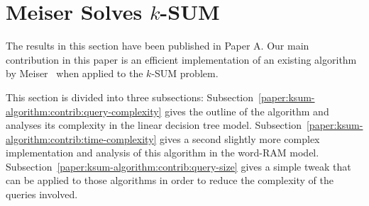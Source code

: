 \section{Meiser Solves \(k\)-SUM}

The results in this section have been published in Paper A.
Our main contribution in this paper is an efficient implementation of an
existing algorithm by Meiser~\cite{M93} when applied to the \(k\)-SUM problem.

This section is divided into three subsections:
Subsection~\ref{paper:ksum-algorithm:contrib:query-complexity} gives the outline of the
algorithm and analyses its complexity in the linear decision tree model.
Subsection~\ref{paper:ksum-algorithm:contrib:time-complexity} gives a second
slightly more complex implementation and analysis of this algorithm in the word-RAM
model. Subsection~\ref{paper:ksum-algorithm:contrib:query-size} gives a simple
tweak that can be applied to those algorithms in order to reduce the complexity
of the queries involved.




